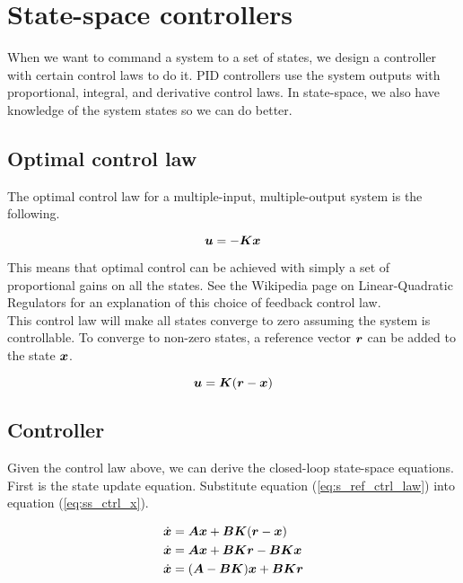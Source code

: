 \section{State-space controllers}

When we want to command a \gls{system} to a set of states, we design a
controller with certain \glspl{control law} to do it. PID controllers use the
system outputs with proportional, integral, and derivative \glspl{control law}.
In state-space, we also have knowledge of the system states so we can do better.

\subsection{Optimal control law}

The optimal \gls{control law} for a multiple-input, multiple-output system is
the following.

\begin{equation}
  \bm u = -\bm K\bm x
\end{equation}

This means that optimal control can be achieved with simply a set of
proportional gains on all the states. See the Wikipedia page on Linear-Quadratic Regulators \cite{bib:lqr} for an explanation of this choice of feedback control
law. \\

This \gls{control law} will make all states converge to zero assuming the system
is controllable. To converge to non-zero states, a reference vector $\bm r$
can be added to the state $\bm x$.

\begin{equation}
  \mtx{u} = \mtx{K}(\mtx{r} - \mtx{x}) \label{eq:s_ref_ctrl_law}
\end{equation}

\subsection{Controller}

Given the \gls{control law} above, we can derive the closed-loop state-space
equations. \\

First is the state update equation. Substitute equation
(\ref{eq:s_ref_ctrl_law}) into equation (\ref{eq:ss_ctrl_x}).

\begin{align}
  \dot{\mtx{x}} &= \mtx{A}\mtx{x} + \mtx{B}\mtx{K}(\mtx{r} - \mtx{x}) \nonumber
    \\
  \dot{\mtx{x}} &= \mtx{A}\mtx{x} + \mtx{B}\mtx{K}\mtx{r} -
    \mtx{B}\mtx{K}\mtx{x} \nonumber \\
  \dot{\mtx{x}} &= (\mtx{A} - \mtx{B}\mtx{K})\mtx{x} + \mtx{B}\mtx{K}\mtx{r}
    \label{eq:s_ref_ctrl_x}
\end{align}

